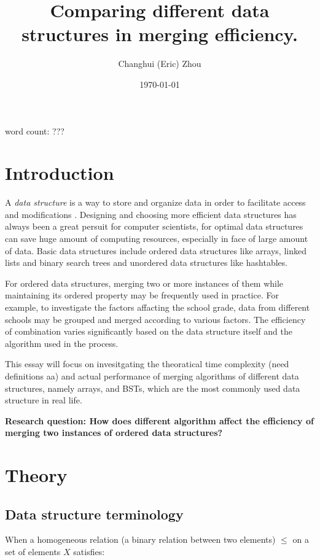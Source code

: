\documentclass[12pt]{article}
\title{\textbf{Comparing different data structures in merging efficiency.}}
\author{Changhui (Eric) Zhou}
\date{\today}
\begin{document}
\begin{titlepage}
    \maketitle
    \centering word count: ???
\end{titlepage}

\tableofcontents
\clearpage

\section{Introduction}

A \textit{data structure} is a way to store and organize data in order to facilitate access and modifications \cite{ItA}. Designing and choosing more efficient data structures has always been a great persuit for computer scientists, for optimal data structures can save huge amount of computing resources, especially in face of large amount of data. Basic data structures include ordered data structures like arrays, linked lists and binary search trees and unordered data structures like hashtables. 

For ordered data structures, merging two or more instances of them while maintaining its ordered property may be frequently used in practice. For example, to investigate the factors affacting the school grade, data from different schools may be grouped and merged according to various factors. The efficiency of combination varies significantly based on the data structure itself and the algorithm used in the process. 

This essay will focus on invesitgating the theoratical time complexity (need definitions aa) and actual performance of merging algorithms of different data structures, namely arrays, and BSTs, which are the most commonly used data structure in real life. 

\textbf{Research question: How does different algorithm affect the efficiency of merging two instances of ordered data structures?}

\section{Theory}

\subsection{Data structure terminology}

When a homogeneous relation (a binary relation between two elements) $\le$ on a set of elements $X$ satisfies:
\end{document}
